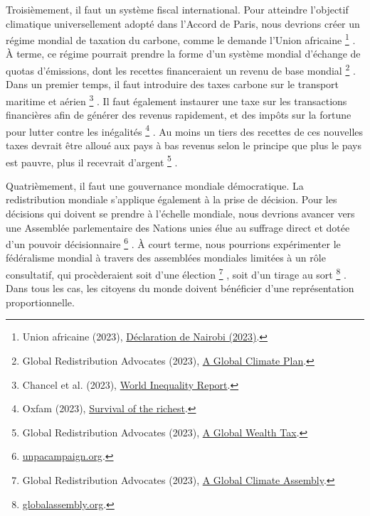 \documentclass[a5paper,french,openany]{memoir}
\begin{document}
Troisièmement, il faut un système fiscal international. Pour atteindre l'objectif climatique universellement adopté dans l'Accord de Paris, nous devrions créer un régime mondial de taxation du carbone, comme le demande l'Union africaine
\footnote{Union africaine (2023), \href{https://media.africaclimatesummit.org/NAIROBI+Declaration+FURTHER+edited+060923+EN+920AM.pdf}{Déclaration de Nairobi (2023)}.}%
.  À terme, ce régime pourrait prendre la forme d'un système mondial d'échange de quotas d'émissions, dont les recettes financeraient un revenu de base mondial
\footnote{Global Redistribution Advocates (2023), \href{https://github.com/bixiou/global\_tax\_attitudes/raw/main/paper/policy\_brief\_GCS.pdf}{A Global Climate Plan}.}%
. Dans un premier temps, il faut introduire des taxes carbone sur le transport maritime et aérien
\footnote{Chancel et al. (2023), \href{https://wid.world/wp-content/uploads/2023/01/CBV2023-ClimateInequalityReport-3.pdf}{World Inequality Report}.}%
. Il faut également instaurer une taxe sur les transactions financières afin de générer des revenus rapidement, et des impôts sur la fortune pour lutter contre les inégalités
\footnote{Oxfam (2023), \href{https://oxfamilibrary.openrepository.com/bitstream/handle/10546/621477/mn-survival-of-the-richest-methodology-160123-en.pdf}{Survival of the richest}.}%
. Au moins un tiers des recettes de ces nouvelles taxes devrait être alloué aux pays à bas revenus selon le principe que plus le pays est pauvre, plus il recevrait d'argent
\footnote{Global Redistribution Advocates (2023), \href{https://github.com/bixiou/global\_tax\_attitudes/raw/main/paper/policy\_brief\_tax.pdf}{A Global Wealth Tax}.}%
.

Quatrièmement, il faut une gouvernance mondiale démocratique. La redistribution mondiale s'applique également à la prise de décision. Pour les décisions qui doivent se prendre à l'échelle mondiale, nous devrions avancer vers une Assemblée parlementaire des Nations unies élue au suffrage direct et dotée d'un pouvoir décisionnaire
\footnote{\href{https://www.unpacampaign.org/}{unpacampaign.org}.}%
. À court terme, nous pourrions expérimenter le fédéralisme mondial à travers des assemblées mondiales limitées à un rôle consultatif, qui procèderaient soit d'une élection
\footnote{Global Redistribution Advocates (2023), \href{https://github.com/bixiou/global\_tax\_attitudes/raw/main/paper/policy\_brief\_assembly.pdf}{A Global Climate Assembly}.}%
, soit d'un tirage au sort
\footnote{\href{https://globalassembly.org/}{globalassembly.org}.}%
. Dans tous les cas, les citoyens du monde doivent bénéficier d'une représentation proportionnelle.
\end{document}
